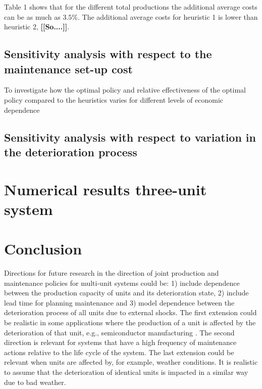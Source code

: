 \documentclass[a4paper,12pt]{article}
\begin{document}
Table 1 shows that for the different total productions the additional average costs can be as much as $3.5$\%. The additional average costs for heuristic 1 is lower than heuristic 2, \textbf{[[So....]]}. 


\subsection{Sensitivity analysis with respect to the maintenance set-up cost}
To investigate how the optimal policy and relative effectiveness of the optimal policy compared to the heuristics varies for different levels of economic dependence

\subsection{Sensitivity analysis with respect to variation in the deterioration process}

\section{Numerical results three-unit system}

\section{Conclusion}

Directions for future research in the direction of joint production and maintenance policies for multi-unit systems could be: 1) include dependence between the production capacity of units and its deterioration state, 2) include lead time for planning maintenance and 3) model dependence between the deterioration process of all units due to external shocks. The first extension could be realistic in some applications where the production of a unit is affected by the deterioration of that unit, e.g., semiconductor manufacturing \citep{kazaz2013impact}. The second direction is relevant for systems that have a high frequency of maintenance actions relative to the life cycle of the system. The last extension could be relevant when units are affected by, for example, weather conditions. It is realistic to assume that the deterioration of identical units is impacted in a similar way due to bad weather. 
\end{document}
